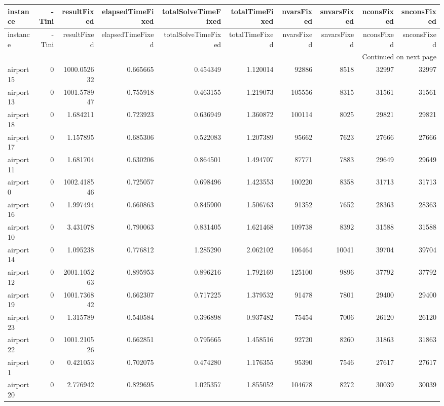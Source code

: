 \documentclass[../../../thesis.tex]{subfiles}
\begin{document}
\tiny
\begin{longtable}{|l|r|r|r|r|r|r|r|r|r|}
\toprule
instance & -Tini & resultFixed & elapsedTimeFixed & totalSolveTimeFixed & totalTimeFixed & nvarsFixed & snvarsFixed & nconsFixed & snconsFixed \\
\midrule
\endfirsthead
\toprule
instance & -Tini & resultFixed & elapsedTimeFixed & totalSolveTimeFixed & totalTimeFixed & nvarsFixed & snvarsFixed & nconsFixed & snconsFixed \\
\midrule
\endhead
\midrule
\multicolumn{10}{r}{Continued on next page} \\
\midrule
\endfoot
\bottomrule
\endlastfoot
airport15 & 0 & 1000.052632 & 0.665665 & 0.454349 & 1.120014 & 92886 & 8518 & 32997 & 32997 \\
airport13 & 0 & 1001.578947 & 0.755918 & 0.463155 & 1.219073 & 105556 & 8315 & 31561 & 31561 \\
airport18 & 0 & 1.684211 & 0.723923 & 0.636949 & 1.360872 & 100114 & 8025 & 29821 & 29821 \\
airport17 & 0 & 1.157895 & 0.685306 & 0.522083 & 1.207389 & 95662 & 7623 & 27666 & 27666 \\
airport11 & 0 & 1.681704 & 0.630206 & 0.864501 & 1.494707 & 87771 & 7883 & 29649 & 29649 \\
airport0 & 0 & 1002.418546 & 0.725057 & 0.698496 & 1.423553 & 100220 & 8358 & 31713 & 31713 \\
airport16 & 0 & 1.997494 & 0.660863 & 0.845900 & 1.506763 & 91352 & 7652 & 28363 & 28363 \\
airport10 & 0 & 3.431078 & 0.790063 & 0.831405 & 1.621468 & 109738 & 8392 & 31588 & 31588 \\
airport14 & 0 & 1.095238 & 0.776812 & 1.285290 & 2.062102 & 106464 & 10041 & 39704 & 39704 \\
airport12 & 0 & 2001.105263 & 0.895953 & 0.896216 & 1.792169 & 125100 & 9896 & 37792 & 37792 \\
airport19 & 0 & 1001.736842 & 0.662307 & 0.717225 & 1.379532 & 91478 & 7801 & 29400 & 29400 \\
airport23 & 0 & 1.315789 & 0.540584 & 0.396898 & 0.937482 & 75454 & 7006 & 26120 & 26120 \\
airport22 & 0 & 1001.210526 & 0.662851 & 0.795665 & 1.458516 & 92720 & 8260 & 31863 & 31863 \\
airport1 & 0 & 0.421053 & 0.702075 & 0.474280 & 1.176355 & 95390 & 7546 & 27617 & 27617 \\
airport20 & 0 & 2.776942 & 0.829695 & 1.025357 & 1.855052 & 104678 & 8272 & 30039 & 30039 \\

\end{longtable}
\end{document}
